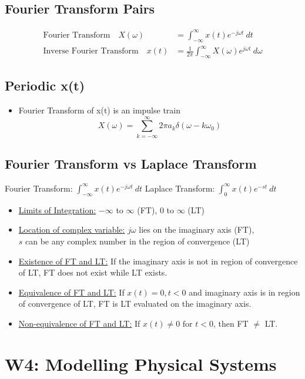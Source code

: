 \documentclass[a4paper]{article}
\begin{document}
\subsection{Fourier Transform Pairs}
\begin{align*}
    \text{Fourier Transform} \quad X(\omega) &= \int_{-\infty}^\infty x(t)e^{-j\omega t}\ dt\\
    \text{Inverse Fourier Transform}\quad x(t) &= \frac{1}{2\pi}\int_{-\infty}^\infty X(\omega)e^{j\omega t}\ d\omega
\end{align*}
\subsection{Periodic x(t)}
\begin{itemize}
    \item Fourier Transform of x(t) is an impulse train
    $$X(\omega) = \sum_{k=-\infty}^{\infty}2\pi a_k \delta(\omega -k\omega_0)$$
\end{itemize}
\subsection{Fourier Transform vs Laplace Transform}
\begin{center}
    Fourier Transform: $\displaystyle \int_{-\infty}^{\infty}x(t)e^{-j\omega t}\ dt$\hspace{1cm} Laplace Transform: $\displaystyle \int_0^\infty x(t)e^{-st}\ dt$
\end{center}
\begin{itemize}
    \item \underline{Limits of Integration:} $-\infty$ to $\infty$ (FT), 0 to $\infty$ (LT)
    \item \underline{Location of complex variable:} $j\omega$ lies on the imaginary axis (FT), \\$s$ can be any complex number in the region of convergence (LT)
    \item \underline{Existence of FT and LT:} If the imaginary axis is not in region of convergence of LT, FT does not exist while LT exists.
    \item \underline{Equivalence of FT and LT:} If $x(t) = 0, t<0$ and imaginary axis is in region of convergence of LT, FT is LT evaluated on the imaginary axis.
    \item \underline{Non-equivalence of FT and LT:} If $x(t) \neq 0 \text{ for } t<0$, then FT $\neq$ LT.
\end{itemize}
\newpage
\section{W4: Modelling Physical Systems}
\end{document}
